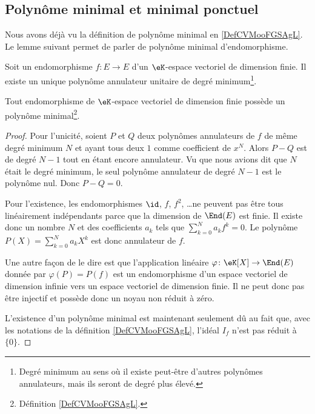 \subsection{Polynôme minimal et minimal ponctuel}

Nous avons déjà vu la définition de polynôme minimal en \ref{DefCVMooFGSAgL}. Le lemme suivant permet de parler de polynôme minimal d'endomorphisme.

\begin{lemma}        \label{LEMooQJQGooRcAxmJ}
	Soit un endomorphisme \( f\colon E\to E\) d'un \( \eK\)-espace vectoriel de dimension finie. Il existe un unique polynôme annulateur unitaire de degré minimum\footnote{Degré minimum au sens où il existe peut-être d'autres polynômes annulateurs, mais ils seront de degré plus élevé.}.

	Tout endomorphisme de \( \eK\)-espace vectoriel de dimension finie possède un polynôme minimal\footnote{Définition \ref{DefCVMooFGSAgL}.}.
\end{lemma}

\begin{proof}
	Pour l'unicité, soient \( P\) et \( Q\) deux polynômes annulateurs de \( f\) de même degré minimum \( N\) et ayant tous deux \( 1\) comme coefficient de \( x^N\). Alors \( P-Q\) est de degré \( N-1\) tout en étant encore annulateur. Vu que nous avions dit que \( N\) était le degré minimum, le seul polynôme annulateur de degré \( N-1\) est le polynôme nul. Donc \( P-Q=0\).

	Pour l'existence, les endomorphismes \( \id\), \( f\), \( f^2\), \ldots ne peuvent pas être tous linéairement indépendants parce que la dimension de \( \End(E)\) est finie. Il existe donc un nombre \( N\) et des coefficients \( a_k\) tels que \( \sum_{k=0}^Na_kf^k=0\). Le polynôme \( P(X)=\sum_{k=0}^Na_kX^k\) est donc annulateur de \( f\).

	Une autre façon de le dire est que l'application linéaire \( \varphi\colon \eK[X]\to \End(E)\) donnée par \( \varphi(P)=P(f)\) est un endomorphisme d'un espace vectoriel de dimension infinie vers un espace vectoriel de dimension finie. Il ne peut donc pas être injectif et possède donc un noyau non réduit à zéro.

	L'existence d'un polynôme minimal est maintenant seulement dû au fait que, avec les notations de la définition \ref{DefCVMooFGSAgL}, l'idéal \( I_f\) n'est pas réduit à \( \{ 0 \}\).
\end{proof}


